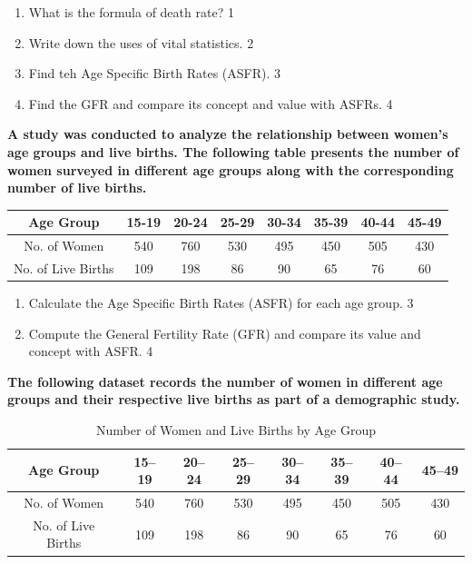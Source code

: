 \documentclass[a4paper,oneside, margin=1.4in]{book}
\begin{document}
  \begin{enumerate}
    \item
	What is the formula of death rate? \hfill 1
    \item
	Write down the uses of vital statistics. \hfill 2
    \item  
	Find teh Age Specific Birth Rates (ASFR). \hfill 3
    \item
	Find the GFR and compare its concept and value with ASFRs. \hfill 4
  \end{enumerate}
  
  \item
\textbf{A study was conducted to analyze the relationship between women's age groups and live births. The following table presents the number of women surveyed in different age groups along with the corresponding number of live births.} 

\begin{table}[H]
\centering
\begin{tabular}{c|c|c|c|c|c|c|c}
Age Group & 15-19 & 20-24 & 25-29 & 30-34 & 35-39 & 40-44 & 45-49 \\ \hline
No. of Women & 540 & 760 & 530 & 495 & 450 & 505 & 430 \\  \hline
No. of Live Births & 109 & 198 & 86 & 90 & 65 & 76 & 60
\end{tabular}
\end{table}


\begin{enumerate}
    \item
    Calculate the Age Specific Birth Rates (ASFR) for each age group. \hfill 3

    \item
    Compute the General Fertility Rate (GFR) and compare its value and concept with ASFR. \hfill 4
\end{enumerate}

\item
\textbf{The following dataset records the number of women in different age groups and their respective live births as part of a demographic study.} 

\begin{table}[H]
\centering
\begin{tabular}{c|c|c|c|c|c|c|c}
Age Group & 15--19 & 20--24 & 25--29 & 30--34 & 35--39 & 40--44 & 45--49 \\ \hline
No. of Women & 540 & 760 & 530 & 495 & 450 & 505 & 430 \\  \hline
No. of Live Births & 109 & 198 & 86 & 90 & 65 & 76 & 60
\end{tabular}
\caption{Number of Women and Live Births by Age Group}
\end{table}
\end{document}
